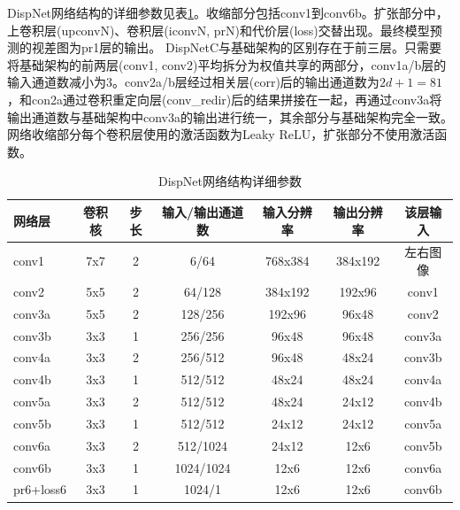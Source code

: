 DispNet网络结构的详细参数见表\ref{tab:4_1_DispNet_architecture}。收缩部分包括conv1到conv6b。扩张部分中，上卷积层(upconvN)、卷积层(iconvN,  prN)和代价层(loss)交替出现。最终模型预测的视差图为pr1层的输出。
DispNetC与基础架构的区别存在于前三层。只需要将基础架构的前两层(conv1, conv2)平均拆分为权值共享的两部分，conv1a/b层的输入通道数减小为3。conv2a/b层经过相关层(corr)后的输出通道数为$2d+1=81$，和con2a通过卷积重定向层(conv\_redir)后的结果拼接在一起，再通过conv3a将输出通道数与基础架构中conv3a的输出进行统一，其余部分与基础架构完全一致。
网络收缩部分每个卷积层使用的激活函数为Leaky ReLU，扩张部分不使用激活函数。

\begin{table}[htbp] %
	\centering
	\caption{DispNet网络结构详细参数}
	\label{tab:4_1_DispNet_architecture}
	\begin{small}   %
		\begin{tabular}{|l|c c c|c c|c|}\hline
			网络层 & 卷积核 & 步长 & 输入/输出通道数 & 输入分辨率 & 输出分辨率 & 该层输入 \\\hline
			conv1    & 7x7 & 2 & 6/64                & 768x384 & 384x192 & 左右图像 \\
			conv2    & 5x5 & 2 & 64/128           & 384x192  & 192x96    & conv1 \\
			conv3a & 5x5 & 2 & 128/256         & 192x96     & 96x48      & conv2 \\
			conv3b & 3x3 & 1 & 256/256        & 96x48       & 96x48      & conv3a\\
			conv4a & 3x3 & 2 & 256/512        & 96x48        & 48x24      & conv3b \\
			conv4b & 3x3 & 1 & 512/512         & 48x24        & 48x24       & conv4a \\
			conv5a & 3x3 & 2 & 512/512         & 48x24        & 24x12        & conv4b \\
			conv5b & 3x3 & 1 & 512/512         & 24x12          & 24x12       & conv5a \\
			conv6a & 3x3 & 2 & 512/1024     & 24x12          & 12x6          & conv5b \\
			conv6b & 3x3 & 1 & 1024/1024  & 12x6             & 12x6          & conv6a \\\hline
			pr6+loss6 & 3x3 & 1 & 1024/1 & 12x6 & 12x6 & conv6b \\\hline

\end{tabular}
\end{small}
\end{table}
